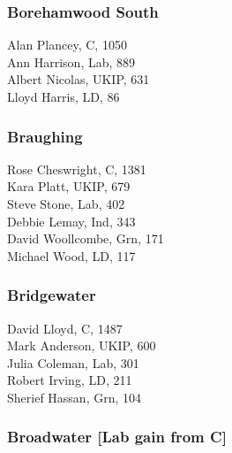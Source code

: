 \documentclass[a4paper,openany,10pt]{book}
\begin{document}
\subsubsection*{Borehamwood South}



Alan Plancey, C, 1050\\
Ann Harrison, Lab, 889\\
Albert Nicolas, UKIP, 631\\
Lloyd Harris, LD, 86\\


\subsubsection*{Braughing}



Rose Cheswright, C, 1381\\
Kara Platt, UKIP, 679\\
Steve Stone, Lab, 402\\
Debbie Lemay, Ind, 343\\
David Woollcombe, Grn, 171\\
Michael Wood, LD, 117\\


\subsubsection*{Bridgewater}



David Lloyd, C, 1487\\
Mark Anderson, UKIP, 600\\
Julia Coleman, Lab, 301\\
Robert Irving, LD, 211\\
Sherief Hassan, Grn, 104\\


\subsubsection*{Broadwater \hspace*{\fill}\nolinebreak[1]%
\enspace\hspace*{\fill}
[Lab gain from C]}

\end{document}
